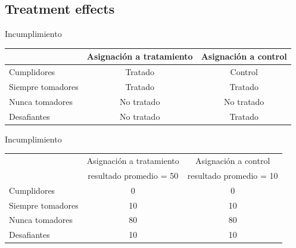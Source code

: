 \documentclass[11pt, aspectratio=169, compress]{beamer}
\begin{document}
\subsection{Treatment effects}
\begin{frame}{Incumplimiento}
	\begin{table}[H]
		\centering 
		\begin{threeparttable}
			\centering 
			\small 
			\begin{tabular}{l c c} \hline \hline 
									& Asignación a tratamiento	& Asignación a control 	\\ \hline
				Cumplidores			& Tratado 					& Control 				\\
				Siempre tomadores 	& Tratado					& Tratado				\\
				Nunca tomadores		& No tratado				& No tratado			\\
				Desafiantes			& No tratado 				& Tratado				\\ \hline 
			\end{tabular}
		\end{threeparttable}
	\end{table}
\end{frame}
\begin{frame}{Incumplimiento}
	\begin{table}[H]
		\centering 
		\begin{threeparttable}
			\centering 
			\small 
			\begin{tabular}{l c c} \hline \hline 
									& Asignación a tratamiento	& Asignación a control 		\\ 
									& resultado promedio = 50	& resultado promedio = 10 	\\ \hline
				Cumplidores			& 0 				& 0 				\\
				Siempre tomadores 	& 10				& 10				\\
				Nunca tomadores		& 80				& 80				\\
				Desafiantes			& 10 				& 10 				\\ \hline 
			\end{tabular}
		\end{threeparttable}
	\end{table}
\end{frame}
\end{document}
